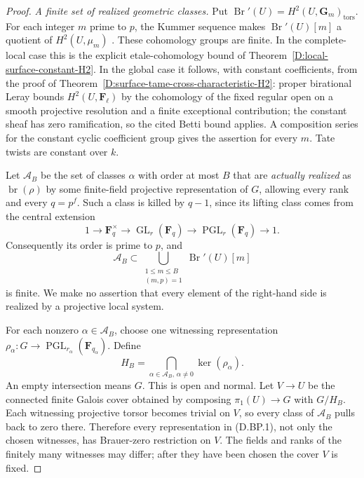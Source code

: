 \begin{proof}
\emph{A finite set of realized geometric classes.}
Put $\operatorname{Br}'(U)=H^2(U,\mathbf G_m)_{\mathrm{tors}}$.
For each integer $m$ prime to $p$, the Kummer sequence makes
$\operatorname{Br}'(U)[m]$ a quotient of $H^2(U,\mu_m)$
\citep[Lemma~59.28.1, Tag 03PK]{StacksBrauerZeroD}.
These cohomology groups are finite.  In the complete-local
case this is the explicit etale-cohomology bound of
Theorem~\ref{D:local-surface-constant-H2}.  In the global
case it follows, with constant coefficients, from the proof
of Theorem~\ref{D:surface-tame-cross-characteristic-H2}:
proper birational Leray bounds $H^2(U,\mathbf F_\ell)$
by the cohomology of the fixed regular open on a smooth
projective resolution and a finite exceptional contribution;
the constant sheaf has zero ramification, so the cited
Betti bound applies.  A composition series for the constant
cyclic coefficient group gives the assertion for every $m$.
Tate twists are constant over $k$.

Let $\mathcal A_B$ be the set of classes $\alpha$ with
order at most $B$ that are \emph{actually realized} as
$\operatorname{br}(\rho)$ by some finite-field projective
representation of $G$, allowing every rank and every
$q=p^f$.  Such a class is killed by $q-1$, since its lifting
class comes from the central extension
\[
 1\longrightarrow\mathbf F_q^\times
 \longrightarrow\operatorname{GL}_r(\mathbf F_q)
 \longrightarrow\operatorname{PGL}_r(\mathbf F_q)
 \longrightarrow1.
\]
Consequently its order is prime to $p$, and
\[
       \mathcal A_B\subset
       \bigcup_{\substack{1\le m\le B\\(m,p)=1}}
                              \operatorname{Br}'(U)[m]
                                                        \tag{D.BP.2}
\]
is finite.  We make no assertion that every element of the
right-hand side is realized by a projective local system.

For each nonzero $\alpha\in\mathcal A_B$, choose one
witnessing representation
$\rho_\alpha:G\to\operatorname{PGL}_{r_\alpha}
(\mathbf F_{q_\alpha})$.  Define
\[
             H_B=\bigcap_{\alpha\in\mathcal A_B,
                            \,\alpha\ne0}\ker(\rho_\alpha).
                                                        \tag{D.BP.3}
\]
An empty intersection means $G$.  This is open and normal.
Let $V\to U$ be the connected finite Galois cover obtained
by composing $\pi_1(U)\to G$ with $G/H_B$.
Each witnessing projective torsor becomes trivial on $V$,
so every class of $\mathcal A_B$ pulls back to zero there.
Therefore every representation in (D.BP.1), not only the
chosen witnesses, has Brauer-zero restriction on $V$.
The fields and ranks of the finitely many witnesses may
differ; after they have been chosen the cover $V$ is fixed.


\end{proof}
